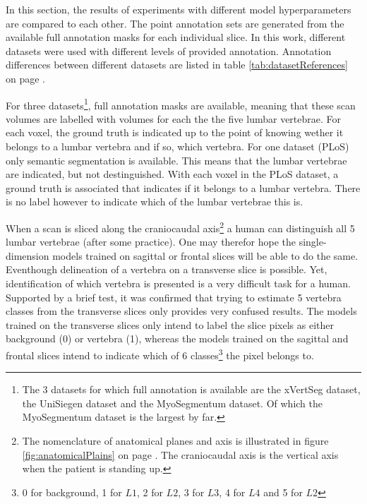 \par{
    In this section, the results of experiments with different model hyperparameters are compared to each other.
    The point annotation sets are generated from the available full annotation masks for each individual slice.
    In this work, different datasets were used with different levels of provided annotation. 
    Annotation differences between different datasets are listed in table \ref{tab:datasetReferences} on page \pageref{tab:datasetReferences}.
}
\par{
    For three datasets\footnote{The 3 datasets for which full annotation is available are the xVertSeg dataset, the UniSiegen dataset and the MyoSegmentum dataset. Of which the MyoSegmentum dataset is the largest by far.},
    full annotation masks are available, meaning that these scan volumes are labelled with volumes for each the the five lumbar vertebrae.
    For each voxel, the ground truth is indicated up to the point of knowing wether it belongs to a lumbar vertebra and if so, which vertebra.
    For one dataset (PLoS) only semantic segmentation is available. This means that the lumbar vertebrae are indicated, but not destinguished. 
    With each voxel in the PLoS dataset, a ground truth is associated that indicates if it belongs to a lumbar vertebra. There is no label however to indicate which of the lumbar vertebrae this is.
}
\par{
    When a scan is sliced along the craniocaudal axis\footnote{
        The nomenclature of anatomical planes and axis is illustrated in figure \ref{fig:anatomicalPlains} on page \pageref{fig:anatomicalPlains}.
        The craniocaudal axis is the vertical axis when the patient is standing up.} 
    a human can distinguish all 5 lumbar vertebrae (after some practice).
    One may therefor hope the single-dimension models trained on sagittal or frontal slices will be able to do the same.
    Eventhough delineation of a vertebra on a transverse slice is possible. 
    Yet, identification of which vertebra is presented is a very difficult task for a human.
    Supported by a brief test, it was confirmed that trying to estimate 5 vertebra classes from the transverse slices only provides very confused results.
    The models trained on the transverse slices only intend to label the slice pixels as either background (0) or vertebra (1), 
    whereas the models trained on the sagittal and frontal slices intend to indicate which of 6 classes\footnote{0 for background, 1 for $L1$, 2 for $L2$, 3 for $L3$, 4 for $L4$ and 5 for $L2$} the pixel belongs to.
}

